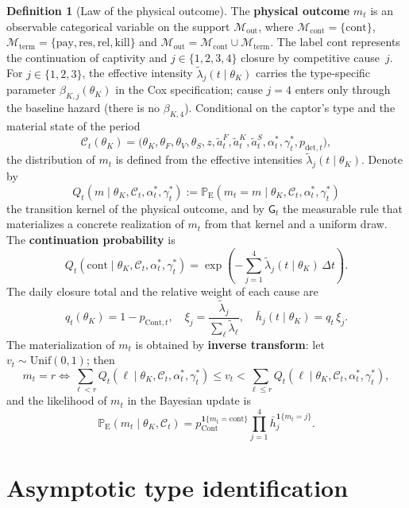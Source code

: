 \documentclass[ecta,nameyear,final,supplement]{econsocart}
\numberwithin{equation}{section}
\numberwithin{table}{section}
\theoremstyle{definition}
\newtheorem{definition}[theorem]{Definition}
\newcommand{\ProbE}{\mathbb{P}_{\mathrm{E}}}
\newcommand{\Unif}{\mathrm{Unif}}
\begin{document}
\begin{definition}[Law of the physical outcome]
\label{def:desenlace-fisico-mt}
The \textbf{physical outcome} $m_t$ is an observable categorical variable on
the support $\mathcal{M}_{\mathrm{out}}$, where
$\mathcal{M}_{\mathrm{cont}}=\{\mathrm{cont}\}$,
$\mathcal{M}_{\mathrm{term}}=\{\mathrm{pay},\mathrm{res},\mathrm{rel},\mathrm{kill}\}$
and $\mathcal{M}_{\mathrm{out}}=\mathcal{M}_{\mathrm{cont}}\cup\mathcal{M}_{\mathrm{term}}$.
The label $\mathrm{cont}$ represents the continuation of captivity and
$j\in\{1,2,3,4\}$ closure by competitive cause~$j$. For $j\in\{1,2,3\}$, the
effective intensity $\tilde\lambda_j(t\mid\theta_K)$ carries the type-specific
parameter $\beta_{K,j}(\theta_K)$ in the Cox specification; cause $j=4$ enters
only through the baseline hazard (there is no $\beta_{K,4}$). Conditional on the
captor's type and the material state of the period
\[
\mathcal{C}_t(\theta_K)
=\bigl(\theta_K,\theta_F,\theta_V,\theta_S,z,
\tilde{a}_t^F,\tilde{a}_t^K,\tilde{a}_t^S,
\alpha_t^\ast,\gamma_t^\ast,p_{\mathrm{det},t}\bigr),
\]
the distribution of $m_t$ is defined from the effective intensities
$\tilde\lambda_j(t\mid\theta_K)$. Denote by
\[
Q_t(m\mid\theta_K,\mathcal C_t,\alpha_t^\ast,\gamma_t^\ast)
:=\ProbE(m_t=m\mid\theta_K,\mathcal C_t,\alpha_t^\ast,\gamma_t^\ast)
\]
the transition kernel of the physical outcome, and by $\mathsf{G}_t$ the
measurable rule that materializes a concrete realization of $m_t$ from that
kernel and a uniform draw. The \textbf{continuation probability} is
\[
Q_t(\mathrm{cont}\mid\theta_K,\mathcal{C}_t,\alpha_t^\ast,\gamma_t^\ast)
=\exp\!\left(-\sum_{j=1}^{4}\tilde\lambda_j(t\mid\theta_K)\,\Delta t\right).
\]
The daily closure total and the relative weight of each cause are
\[
q_t(\theta_K)=1-p_{\mathrm{Cont},t},\quad
\xi_j=\frac{\tilde\lambda_j}{\sum_\ell\tilde\lambda_\ell},\quad
\bar h_j(t\mid\theta_K)=q_t\,\xi_j.
\]
The materialization of $m_t$ is obtained by \textbf{inverse transform}:
let $v_t\sim\Unif(0,1)$; then
\[
m_t=r
\iff
\sum_{\ell<r}Q_t(\ell\mid\theta_K,\mathcal{C}_t,\alpha_t^\ast,\gamma_t^\ast)\le v_t
<\sum_{\ell\le r}Q_t(\ell\mid\theta_K,\mathcal{C}_t,\alpha_t^\ast,\gamma_t^\ast),
\]
and the likelihood of $m_t$ in the Bayesian update is
\[
\ProbE(m_t\mid\theta_K,\mathcal{C}_t)
=p_{\mathrm{Cont}}^{\mathbf{1}\{m_t=\mathrm{cont}\}}
\prod_{j=1}^{4}\bar h_j^{\mathbf{1}\{m_t=j\}}.
\]
\end{definition}

\section{Asymptotic type identification}
\label{sec:id-asintotica}
\end{document}
